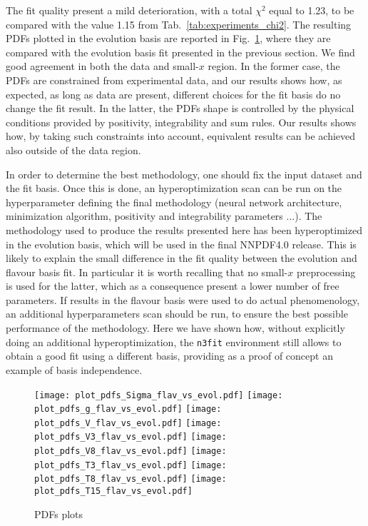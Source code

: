 %
The fit quality present a mild deterioration, with a total $\chi^2$ equal to 1.23, 
to be compared with the value 1.15 from Tab.~\ref{tab:experiments_chi2}.
The resulting PDFs plotted in the evolution basis are reported in Fig.~\ref{fig:pdfs_plots_flav_vs_evol}, 
where they are compared with the evolution basis fit presented in the previous section.
We find good agreement in both the data and small-$x$ region. In the former case, the PDFs are constrained from experimental
data, and our results shows how, as expected, as long as data are present,
different choices for the fit basis do no change the fit result. In the latter, the PDFs shape is controlled
by the physical conditions provided by positivity, integrability and sum rules. Our results shows how, by taking 
such constraints into account, equivalent results can be achieved also outside of the data region.

%
In order to determine the best methodology, one should fix the input dataset and the fit basis. Once this is done,
an hyperoptimization scan can be run on the hyperparameter defining the final methodology 
(neural network architecture, minimization algorithm, positivity and integrability parameters ...).
The methodology used to produce the results presented here has been hyperoptimized in the evolution basis,
which will be used in the final NNPDF4.0 release. This is likely to explain the small difference in the fit quality
between the evolution and flavour basis fit. In particular it is worth recalling that no small-$x$ preprocessing
is used for the latter, which as a consequence present a lower number of free parameters.
If results in the flavour basis were used to do actual phenomenology, an additional hyperparameters scan
should be run, to ensure the best possible performance of the methodology. 
Here we have shown how, without explicitly doing an additional hyperoptimization, the {\tt n3fit} environment still
allows to obtain a good fit using a different basis, providing as a proof of concept an example of basis independence.


\begin{figure}[t!]
    \begin{center}
        \texttt{[image: plot\_pdfs\_Sigma\_flav\_vs\_evol.pdf]}
        \texttt{[image: plot\_pdfs\_g\_flav\_vs\_evol.pdf]}
        \texttt{[image: plot\_pdfs\_V\_flav\_vs\_evol.pdf]}
        \texttt{[image: plot\_pdfs\_V3\_flav\_vs\_evol.pdf]}
        \texttt{[image: plot\_pdfs\_V8\_flav\_vs\_evol.pdf]}
        \texttt{[image: plot\_pdfs\_T3\_flav\_vs\_evol.pdf]}
        \texttt{[image: plot\_pdfs\_T8\_flav\_vs\_evol.pdf]}
        \texttt{[image: plot\_pdfs\_T15\_flav\_vs\_evol.pdf]}
        \caption{PDFs plots} 
        \label{fig:pdfs_plots_flav_vs_evol} 
    \end{center}
  \end{figure}



